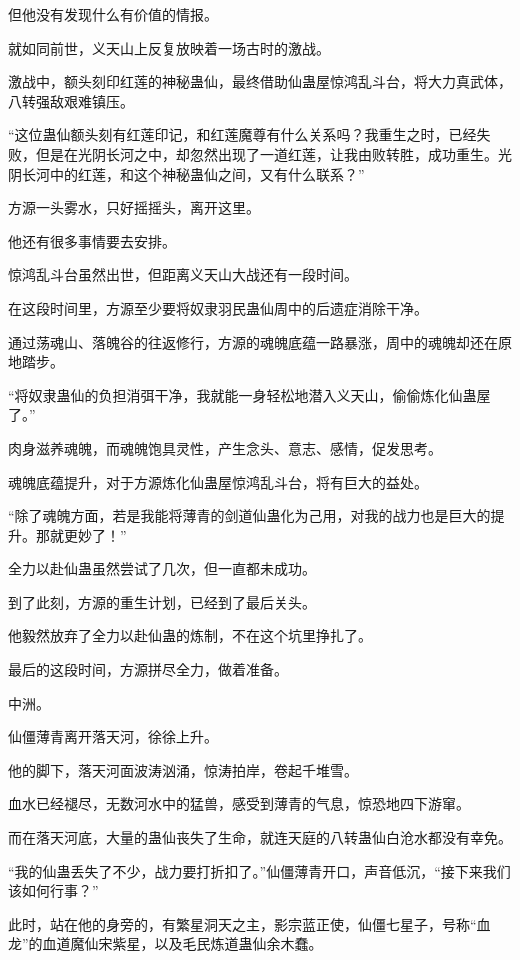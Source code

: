 \begin{this_body}
但他没有发现什么有价值的情报。

就如同前世，义天山上反复放映着一场古时的激战。

激战中，额头刻印红莲的神秘蛊仙，最终借助仙蛊屋惊鸿乱斗台，将大力真武体，八转强敌艰难镇压。

“这位蛊仙额头刻有红莲印记，和红莲魔尊有什么关系吗？我重生之时，已经失败，但是在光阴长河之中，却忽然出现了一道红莲，让我由败转胜，成功重生。光阴长河中的红莲，和这个神秘蛊仙之间，又有什么联系？”

方源一头雾水，只好摇摇头，离开这里。

他还有很多事情要去安排。

惊鸿乱斗台虽然出世，但距离义天山大战还有一段时间。

在这段时间里，方源至少要将奴隶羽民蛊仙周中的后遗症消除干净。

通过荡魂山、落魄谷的往返修行，方源的魂魄底蕴一路暴涨，周中的魂魄却还在原地踏步。

“将奴隶蛊仙的负担消弭干净，我就能一身轻松地潜入义天山，偷偷炼化仙蛊屋了。”

肉身滋养魂魄，而魂魄饱具灵性，产生念头、意志、感情，促发思考。

魂魄底蕴提升，对于方源炼化仙蛊屋惊鸿乱斗台，将有巨大的益处。

“除了魂魄方面，若是我能将薄青的剑道仙蛊化为己用，对我的战力也是巨大的提升。那就更妙了！”

全力以赴仙蛊虽然尝试了几次，但一直都未成功。

到了此刻，方源的重生计划，已经到了最后关头。

他毅然放弃了全力以赴仙蛊的炼制，不在这个坑里挣扎了。

最后的这段时间，方源拼尽全力，做着准备。

中洲。

仙僵薄青离开落天河，徐徐上升。

他的脚下，落天河面波涛汹涌，惊涛拍岸，卷起千堆雪。

血水已经褪尽，无数河水中的猛兽，感受到薄青的气息，惊恐地四下游窜。

而在落天河底，大量的蛊仙丧失了生命，就连天庭的八转蛊仙白沧水都没有幸免。

“我的仙蛊丢失了不少，战力要打折扣了。”仙僵薄青开口，声音低沉，“接下来我们该如何行事？”

此时，站在他的身旁的，有繁星洞天之主，影宗蓝正使，仙僵七星子，号称“血龙”的血道魔仙宋紫星，以及毛民炼道蛊仙余木蠢。


\end{this_body}
